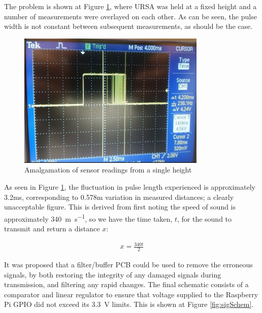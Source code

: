 \documentclass[capstone_report.tex]{subfiles}
\begin{document}
The problem is shown at Figure \ref{fig:badSig}, where URSA was held at a fixed height and a number of measurements were overlayed on each other. As can be seen, the pulse width is not constant between subsequent measurements, as should be the case.
    \begin{figure}[H]
        \centering
        \includegraphics[width=0.8\textwidth]{imgs/pulseBroad.jpg}
        \caption{Amalgamation of sensor readings from a single height\label{fig:badSig}}
    \end{figure}

As seen in Figure \ref{fig:badSig}, the fluctuation in pulse length experienced is approximately 3.2ms, corresponding to 0.578m variation in measured distances; a clearly unacceptable figure. This is derived from first noting the speed of sound is approximately \SI{340}{\metre\per\second}, so we have the time taken, $t$, for the sound to transmit and return a distance $x$:

\begin{align*}
	x=\frac{340t}{2}
\end{align*}

It was proposed that a filter/buffer PCB could be used to remove the erroneous signals, by both restoring the integrity of any damaged signals during transmission, and filtering any rapid changes. The final schematic consists of a comparator and linear regulator to ensure that voltage supplied to the Raspberry Pi GPIO did not exceed its \SI{3.3}{\volt} limits. This is shown at Figure \ref{fig:sigSchem}.
\end{document}
